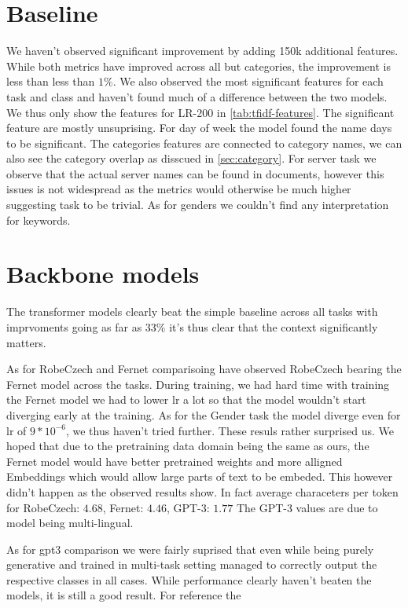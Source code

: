 \section{Baseline}
\label{sec:baseline}
We haven't observed significant improvement by adding 150k additional features.
While both metrics have improved across all but categories, the improvement is
less than less than $1\%$. 
We also observed the most significant features for each task and class and
haven't found much of a difference between the two models.
We thus only show the features for LR-200 in \autoref{tab:tfidf-features}.
The significant feature are mostly unsuprising. For day of week the model
found the name days to be significant. The categories features are
connected to category names, we can also see the category overlap
as disscued in \autoref{sec:category}. For server task we observe
that the actual server names can be found in documents, however
this issues is not widespread as the metrics would otherwise be much
higher suggesting task to be trivial. As for genders we couldn't
find any interpretation for keywords.


\section{Backbone models}
The transformer models clearly beat the simple baseline across all tasks
with imprvoments going as far as $33\%$ it's thus clear that the context
significantly matters.

As for RobeCzech and Fernet comparisoing have observed RobeCzech bearing the Fernet model
across the tasks. During training, we had hard time with training the Fernet model
we had to lower lr a lot so that the model wouldn't start diverging early at the training.
As for the Gender task the model diverge even for lr of $9*10^{-6}$,
we thus haven't tried further.
These resuls rather surprised us. We hoped that due to the pretraining data domain
being the same as ours, the Fernet model would have better pretrained weights
and more alligned Embeddings which would allow large parts of text to be embeded.
This however didn't happen as the observed results show.
In fact average characeters per token for RobeCzech: $4.68$, Fernet: $4.46$, GPT-3: $1.77$
The GPT-3 values are due to model being multi-lingual.

As for gpt3 comparison we were fairly suprised that even while being purely generative
and trained in multi-task setting managed to correctly output the respective classes in all cases.
While performance clearly haven't beaten the models, it is still a good result.
For reference the 

